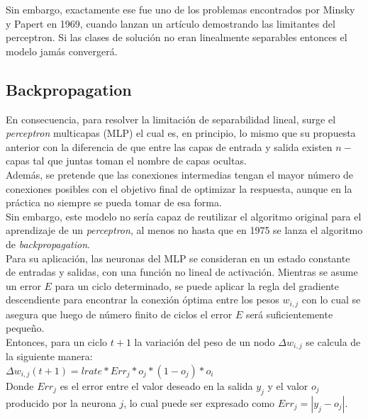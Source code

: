 \documentclass{llncs}
\begin{document}
{Sin embargo, exactamente ese fue uno de los problemas encontrados por Minsky y \-Papert en 1969, cuando lanzan un art\'iculo demostrando las limitantes
del perceptron. Si las clases de soluci\'on no eran linealmente separables entonces el modelo jam\'as converger\'a.

\subsection{Backpropagation}

En consecuencia, para resolver la limitaci\'on de separabilidad lineal, surge el \textit{perceptron} multicapas (MLP) el cual es, en principio, lo mismo que su propuesta
anterior con la diferencia de que entre las capas de entrada y salida existen $n-$capas tal que juntas toman el nombre de capas ocultas.\\
Adem\'as, se pretende que las conexiones intermedias tengan el mayor n\'umero de conexiones posibles con el objetivo final de optimizar la respuesta, aunque
en la pr\'actica no siempre se pueda tomar de esa forma.\\


Sin embargo, este modelo no ser\'ia capaz de reutilizar el algoritmo original para el aprendizaje de un \textit{perceptron}, al menos no hasta que en 1975 se lanza el
algoritmo de \textit{backpropagation}. \\

Para su aplicaci\'on, las neuronas del MLP se consideran en un estado constante de entradas y salidas, con una funci\'on no lineal de activaci\'on. Mientras se
asume un error $E$ para un ciclo determinado, se puede aplicar la regla del gradiente descendiente para encontrar la conexi\'on \'optima entre los pesos $w_{i,j}$
con lo cual se asegura que luego de n\'umero finito de ciclos el error $E$ ser\'a suficientemente peque\~no.\\

Entonces, para un ciclo $t+1$ la variaci\'on del peso de un nodo $\Delta w_{i,j}$ se calcula de la siguiente manera: \\

$\Delta w_{i,j} (t + 1) = lrate * Err_{j} * o_j * (1 - o_j) * o_i$ \\

Donde $Err_j$ es el error entre el valor deseado en la salida $y_j$ y el valor $o_j$ producido por la neurona $j$, lo cual puede ser expresado como $Err_j = |y_j - o_j|$. \\

}
\end{document}

